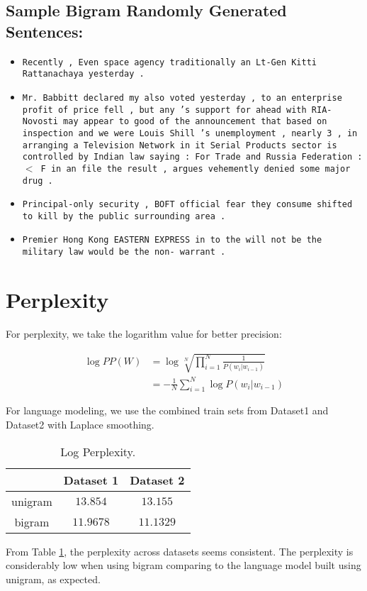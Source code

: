 \documentclass[12pt]{article}
\begin{document}
\subsection{Sample Bigram Randomly Generated Sentences:}

\begin{itemize}
\item \texttt{Recently , Even space agency traditionally an Lt-Gen Kitti Rattanachaya yesterday .}

\item \texttt{Mr. Babbitt declared my also voted yesterday , to an enterprise profit of price fell , but any 's support for ahead with RIA-Novosti may appear to good of the announcement that based on inspection and we were Louis Shill 's unemployment , nearly 3 , in arranging a Television Network in it Serial Products sector is controlled by Indian law saying : For Trade and Russia Federation : $<$ F in an file the result , argues vehemently denied some major drug .}

\item \texttt{Principal-only security , BOFT official fear they consume shifted to kill by the public surrounding area .}

\item \texttt{Premier Hong Kong EASTERN EXPRESS in to the will not be the military law would be the non- warrant .}

\end{itemize}

\section{Perplexity}

For perplexity, we take the logarithm value for better precision:

\begin{align*}
\log PP(W) &= \log \sqrt[N]{\prod_{i=1}^{N}\frac{1}{P(w_i | w_{i-1})}}\\
    &=-\frac{1}{N}\sum_{i=1}^{N}\log P(w_i | w_{i-1})
\end{align*}

For language modeling, we use the combined train sets from Dataset1 and
Dataset2 with Laplace smoothing.

\begin{table}[htb]
\begin{center}
\begin{tabular}{|c|c|c|}
\hline
&Dataset 1 & Dataset 2\\
\hline
unigram & $13.854$ & $13.155$\\
\hline
bigram & $11.9678$ & $11.1329$\\
\hline
\end{tabular}
\end{center}
\caption{\label{table:perplexity} Log Perplexity.}
\end{table}
From Table \ref{table:perplexity}, the perplexity across datasets seems
consistent. The perplexity is considerably low when using bigram comparing
to the language model built using unigram, as expected.
\end{document}
